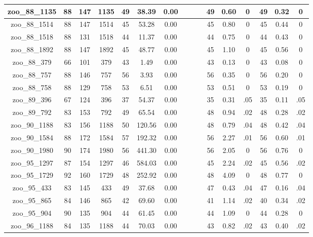 \begin{landscape}
\begin{longtable}{|c|c|c|c|c|c|c|c|c|c|c|c|c|c|c|c|}
zoo\_88\_1135 & 88 & 147 & 1135 & 49 & 38.39 & 0.00 &  &  &  & 49 & 0.60 & 0 & 49 & 0.32 & 0 \\ \hline 
zoo\_88\_1514 & 88 & 147 & 1514 & 45 & 53.28 & 0.00 &  &  &  & 45 & 0.80 & 0 & 45 & 0.44 & 0 \\ \hline 
zoo\_88\_1518 & 88 & 131 & 1518 & 44 & 11.37 & 0.00 &  &  &  & 44 & 0.75 & 0 & 44 & 0.43 & 0 \\ \hline 
zoo\_88\_1892 & 88 & 147 & 1892 & 45 & 48.77 & 0.00 &  &  &  & 45 & 1.10 & 0 & 45 & 0.56 & 0 \\ \hline 
zoo\_88\_379 & 66 & 101 & 379 & 43 & 1.49 & 0.00 &  &  &  & 43 & 0.13 & 0 & 43 & 0.08 & 0 \\ \hline 
zoo\_88\_757 & 88 & 146 & 757 & 56 & 3.93 & 0.00 &  &  &  & 56 & 0.35 & 0 & 56 & 0.20 & 0 \\ \hline 
zoo\_88\_758 & 88 & 129 & 758 & 53 & 6.51 & 0.00 &  &  &  & 53 & 0.51 & 0 & 53 & 0.19 & 0 \\ \hline 
zoo\_89\_396 & 67 & 124 & 396 & 37 & 54.37 & 0.00 &  &  &  & 35 & 0.31 & .05 & 35 & 0.11 & .05 \\ \hline 
zoo\_89\_792 & 83 & 153 & 792 & 49 & 65.54 & 0.00 &  &  &  & 48 & 0.94 & .02 & 48 & 0.28 & .02 \\ \hline 
zoo\_90\_1188 & 83 & 156 & 1188 & 50 & 120.56 & 0.00 &  &  &  & 48 & 0.79 & .04 & 48 & 0.42 & .04 \\ \hline 
zoo\_90\_1584 & 88 & 172 & 1584 & 57 & 192.32 & 0.00 &  &  &  & 56 & 2.27 & .01 & 56 & 0.60 & .01 \\ \hline 
zoo\_90\_1980 & 90 & 174 & 1980 & 56 & 441.30 & 0.00 &  &  &  & 56 & 2.05 & 0 & 56 & 0.76 & 0 \\ \hline 
zoo\_95\_1297 & 87 & 154 & 1297 & 46 & 584.03 & 0.00 &  &  &  & 45 & 2.24 & .02 & 45 & 0.56 & .02 \\ \hline 
zoo\_95\_1729 & 92 & 160 & 1729 & 48 & 252.92 & 0.00 &  &  &  & 48 & 4.09 & 0 & 48 & 0.77 & 0 \\ \hline 
zoo\_95\_433 & 83 & 145 & 433 & 49 & 37.68 & 0.00 &  &  &  & 47 & 0.43 & .04 & 47 & 0.16 & .04 \\ \hline 
zoo\_95\_865 & 84 & 146 & 865 & 42 & 69.60 & 0.00 &  &  &  & 41 & 1.14 & .02 & 40 & 0.34 & .02 \\ \hline 
zoo\_95\_904 & 90 & 135 & 904 & 44 & 61.45 & 0.00 &  &  &  & 44 & 1.09 & 0 & 44 & 0.28 & 0 \\ \hline 
zoo\_96\_1188 & 84 & 135 & 1188 & 44 & 70.03 & 0.00 &  &  &  & 43 & 0.82 & .02 & 43 & 0.40 & .02 \\ \hline 

\end{longtable}
\end{landscape}
